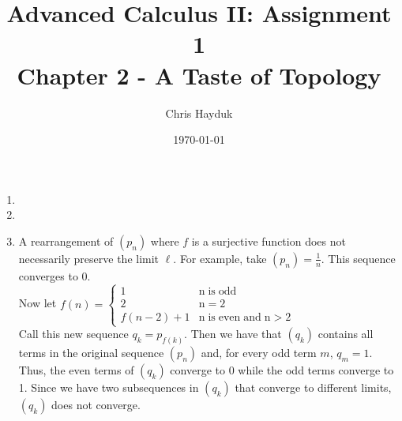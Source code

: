 \documentclass[12pt]{article}
\newenvironment{problem}[2][Problem]{\begin{trivlist}
\item[\hskip \labelsep {\bfseries #1}\hskip \labelsep {\bfseries #2.}]}{\end{trivlist}}
\begin{document}
\title{Advanced Calculus II: Assignment 1\\Chapter 2 - A Taste of Topology}

\author{Chris Hayduk}
\date{\today}

\maketitle

\begin{problem}{12 on p. 126}
\end{problem}

\begin{enumerate}[label=(\alph*)]
	\item
	\item
	\item A rearrangement of $(p_n)$ where $f$ is a surjective function does not necessarily preserve the limit $\ell$. For example, take $(p_n) = \frac{1}{n}$. This sequence converges to 0.\\
	
	Now let $f(n) = \begin{cases} 
      1 & \mathrm{n \; is \; odd}\\
      2 & \mathrm{n = 2}\\
      f(n-2)+1 & \mathrm{n \; is \; even \; and \; n > 2}
   \end{cases}$\\
   
   Call this new sequence $q_k = p_{f(k)}$. Then we have that $(q_k)$ contains all terms in the original sequence $(p_n)$ and, for every odd term $m$, $q_m = 1$. Thus, the even terms of $(q_k)$ converge to 0 while the odd terms converge to 1. Since we have two subsequences in $(q_k)$ that converge to different limits, $(q_k)$ does not converge.
\end{enumerate}

\begin{problem}{44 on p. 128}
\end{problem}

\begin{problem}{76 on p. 131}
\end{problem}

\begin{problem}{1 on p. 147}
\end{problem}
\end{document}
